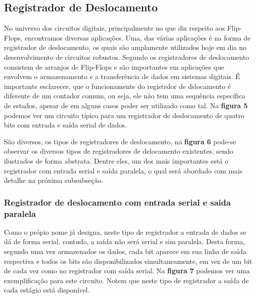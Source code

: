 \documentclass[12pt]{article}
\begin{document}

\subsection{Registrador de Deslocamento}

No universo dos circuitos digitais, principalmente no que diz respeito aos Flip-Flops, encontramos diversas aplicações. Uma, das várias aplicações é na forma de registrador de deslocamento, os quais são amplamente utilizados hoje em dia no desenvolvimento de circuitos robustos. Segundo \cite{floyd2011digital} os registradores de deslocamento consistem de arranjos de Flip-Flops e são importantes em aplicações que envolvem o armazenamento e a transferência de dados em sistemas digitais. É importante esclarecer, que o funcionamente do registrdor de dslocamento é diferente de um contador comum, ou seja, ele não tem uma sequência específica de estados, apesar de em alguns casos poder ser utilizado como tal. Na \textbf{figura 5} podemos ver um circuito típico para um registrador de deslocamento de quatro bits com entrada e saída serial de dados.


São diversos, os tipos de registradores de deslocamento, na \textbf{figura 6} pode-se observar os diversos tipos de registradores de delocamento existentes, sendo ilustrados de forma abstrata. Dentre eles, um dos mais importantes está o registrador com entrada serial e saída paralela, o qual será abordado com mais detalhe na próxima subsubseção.




\subsubsection{Registrador de deslocamento com entrada serial e saída paralela}

Como o própio nome já designa, neste tipo de registrador a entrada de dados se dá de forma serial, contudo, a saída não será serial e sim paralela. Desta forma, segundo \cite{floyd2011digital} uma vez armazenados os dados, cada bit aparece em sua linha de saída respectiva e todos os bits são disponibilizados simultaneamente, em vez de um bit de cada vez como no registrador com saída serial. Na \textbf{figura 7} podemos ver uma exemplificação para este circuito. Notem que neste tipo de registrador a saída de cada estágio está disponível.
\end{document}
